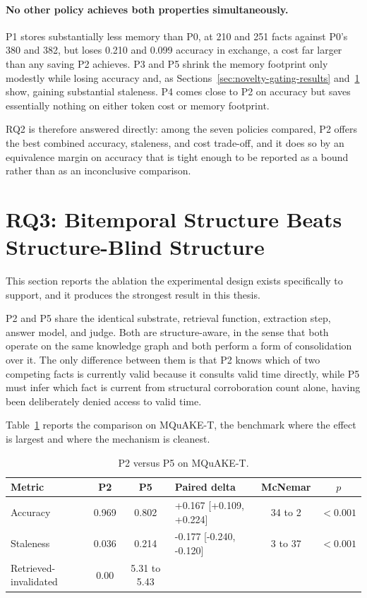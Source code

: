 \paragraph{No other policy achieves both properties simultaneously.} P1 stores substantially less memory than P0, at 210 and 251 facts against P0's 380 and 382, but loses 0.210 and 0.099 accuracy in exchange, a cost far larger than any saving P2 achieves. P3 and P5 shrink the memory footprint only modestly while losing accuracy and, as Sections~\ref{sec:novelty-gating-results} and~\ref{sec:rq3} show, gaining substantial staleness. P4 comes close to P2 on accuracy but saves essentially nothing on either token cost or memory footprint.

RQ2 is therefore answered directly: among the seven policies compared, P2 offers the best combined accuracy, staleness, and cost trade-off, and it does so by an equivalence margin on accuracy that is tight enough to be reported as a bound rather than as an inconclusive comparison.

\section{RQ3: Bitemporal Structure Beats Structure-Blind Structure}
\label{sec:rq3}

This section reports the ablation the experimental design exists specifically to support, and it produces the strongest result in this thesis.

P2 and P5 share the identical substrate, retrieval function, extraction step, answer model, and judge. Both are structure-aware, in the sense that both operate on the same knowledge graph and both perform a form of consolidation over it. The only difference between them is that P2 knows which of two competing facts is currently valid because it consults valid time directly, while P5 must infer which fact is current from structural corroboration count alone, having been deliberately denied access to valid time.

Table~\ref{tab:rq3-mquake} reports the comparison on MQuAKE-T, the benchmark where the effect is largest and where the mechanism is cleanest.

\begin{table}[H]
\centering
\caption{P2 versus P5 on MQuAKE-T.}
\label{tab:rq3-mquake}
\small
\begin{tabular}{p{2.6cm}ccp{2.7cm}cc}
\toprule
Metric & P2 & P5 & Paired delta & McNemar & $p$ \\
\midrule
Accuracy & 0.969 & 0.802 & +0.167 [+0.109, +0.224] & 34 to 2 & $< 0.001$ \\
Staleness & 0.036 & 0.214 & -0.177 [-0.240, -0.120] & 3 to 37 & $< 0.001$ \\
Retrieved-invalidated & 0.00 & 5.31 to 5.43 & & & \\
\bottomrule
\end{tabular}
\end{table}

